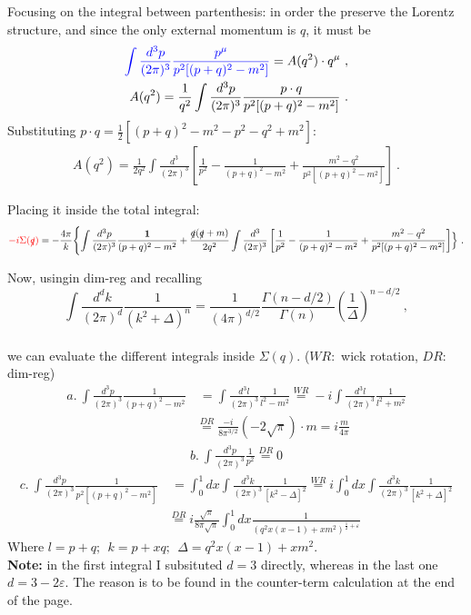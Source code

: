\documentclass[a4paper,11pt,DIV=12]{scrartcl}
\begin{document}
Focusing on the integral between partenthesis:
in order the preserve the Lorentz structure, and since the only external momentum is $q$, it must be
\begin{align*}
    \textcolor{blue}{\int \frac{d^3p}{(2\pi)^3} \frac{p^\mu}{p^2 [(p+q)^2 - m^2]}} = A(q^2)\cdot q^\mu \ ,
    \\
    A(q^2)= \frac{1}{q^2}\int \frac{d^3p}{(2\pi)^3} \frac{p\cdot q}{p^2 [(p+q)^2 - m^2]}\ .
\end{align*}
Substituting $p\cdot q = \frac{1}{2}[(p+q)^2-m^2 - p^2 - q^2 + m^2]$:
\begin{align*}
    A(q^2) = \frac{1}{2 q^2} \int \frac{d^3}{(2\pi)^3} \left[ \frac{1}{p^2} - \frac{1}{(p+q)^2-m^2} + \frac{m^2 - q^2}{p^2[(p+q)^2 - m^2]} \right]\ .
\end{align*}

Placing it inside the total integral: 
\begin{align*}
    \textcolor{red} {-i \Sigma(\slashed{q})}=-\frac{4\pi}{k}\Biggl\{ \int \frac{d^3p}{(2\pi)^3} \frac{\mathbf{1}}{(p+q)^2-m^2} + \frac{\slashed{q}(\slashed{q}+m)}{2q^2}\int \frac{d^3}{(2\pi)^3} \left[\frac{1}{p^2} - \frac{1}{(p+q)^2-m^2} + \frac{m^2 - q^2}{p^2[(p+q)^2 - m^2]} \right]  \Bigr\}\ .
\end{align*}

Now, usingin dim-reg and recalling
$$
\int \frac{d^d k}{(2\pi)^d} \frac{1}{(k^2 + \Delta)^n}
= \frac{1}{(4\pi)^{d/2}} \frac{\Gamma(n - d/2)}{\Gamma(n)}
\left( \frac{1}{\Delta} \right)^{n - d/2}\ ,
$$
\\
we can evaluate the different integrals inside $\Sigma(q)$. ($WR:$ wick rotation, $DR:$ dim-reg)
\begin{align*}
   a.\  \int \frac{d^3 p}{(2\pi)^3} \frac{1}{(p+q)^2 - m^2}&\ 
= \int \frac{d^3 l}{(2\pi)^3} \frac{1}{l^2 - m^2} \stackrel{WR}{=} -i \int \frac{d^3 l}{(2\pi)^3} \frac{1}{l^2 + m^2} 
\\ &\stackrel{DR}{=}\frac{-i}{8\pi^{3/2}} (-2\sqrt{\pi}) \cdot m = i\frac{m}{4 \pi}
\end{align*}
\begin{align*}
    b.\ \int \frac{d^3 p}{(2 \pi)^3} \frac{1}{p^2} \stackrel{DR}{=} 0 
\end{align*}
\begin{align*}
    c.\ \int \frac{d^3 p}{(2\pi)^3} \frac{1}{p^2 [(p+q)^2-m^2]}&\ =\int_0^1 dx \int \frac{d^3 k }{(2 \pi)^3}\frac{1}{[k^2-\Delta]^2} \stackrel{WR}{=} i \int_0^1 dx \int \frac{d^3 k }{(2 \pi)^3} \frac{1}{[k^2 + \Delta]^2}
    \\ &\stackrel{DR}{=}i\frac{\sqrt{\pi}}{8 \pi \sqrt{\pi}}\int_0^1 dx \frac{1}{(q^2 x(x-1)+xm^2)^{\frac{1}{2}+\varepsilon}}
\end{align*}
Where $l=p+q;\ \ k=p+xq; \ \ \Delta=q^2 x(x-1)+xm^2$.
\\
\textbf{Note:} in the first integral I subsituted $d=3$ directly, whereas in the last one $d=3-2\varepsilon$. The reason is to be found in the counter-term calculation at the end of the page.
\end{document}
